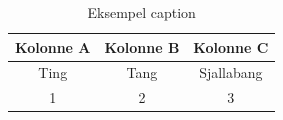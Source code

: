 

\begin{table}[h]
	\centering %
	\setlength{\belowcaptionskip}{6pt} %
	\setlength{\tabcolsep}{3pt} %

	\caption{Eksempel caption}
	\label{tab:referansenavn}

	\noindent
	\begin{tabular}{c|c|c} %
		\hline
		Kolonne A & Kolonne B & Kolonne C \\
		\hline
		Ting & Tang & Sjallabang \\
		1 & 2 & 3 \\
		\hline
	\end{tabular}
\end{table}
